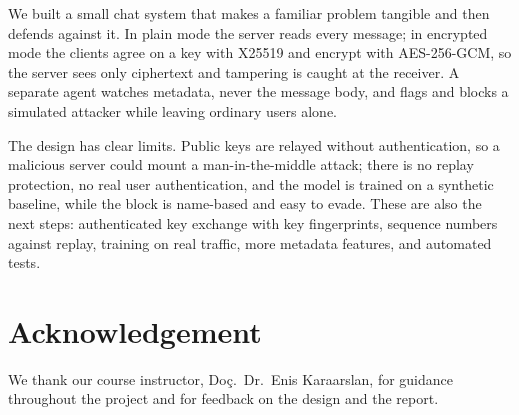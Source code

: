 \documentclass[onecolumn]{article}
\begin{document}
We built a small chat system that makes a familiar problem tangible and then defends against it. In plain mode the server reads every message; in encrypted mode the clients agree on a key with X25519 and encrypt with AES-256-GCM, so the server sees only ciphertext and tampering is caught at the receiver. A separate agent watches metadata, never the message body, and flags and blocks a simulated attacker while leaving ordinary users alone.

The design has clear limits. Public keys are relayed without authentication, so a malicious server could mount a man-in-the-middle attack; there is no replay protection, no real user authentication, and the model is trained on a synthetic baseline, while the block is name-based and easy to evade. These are also the next steps: authenticated key exchange with key fingerprints, sequence numbers against replay, training on real traffic, more metadata features, and automated tests.

\section*{Acknowledgement}

We thank our course instructor, Do\c{c}.\ Dr.\ Enis Karaarslan, for guidance throughout the project and for feedback on the design and the report.
\end{document}
